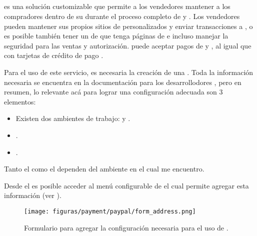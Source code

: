		\subsection*{\PPPaymentProNAME}
			\PPPaymentProNAME es una solución customizable que permite a los vendedores mantener a los compradores dentro de su \websiteINT durante el proceso completo de \paymentsCOM y \checkoutCOM. Los vendedores pueden mantener sus propios sitios de \checkoutCOM personalizados y enviar transacciones a \paypalNAME, o es posible también tener un \hostCPT de \paypalNAME que tenga páginas de \checkoutCOM e incluso manejar la seguridad para las ventas y autorización. \PPPaymentProNAME puede aceptar pagos de \paypalNAME y  \paypalCreditNAME, al igual que con tarjetas de crédito de pago \cite{online_paypal_developer_acceptpayments}.

			Para el uso de este servicio, es necesaria la creación de una \paypalNAME \appINT. Toda la información necesaria se encuentra en la documentación para los desarrollodores \cite{online_paypal_developer_apps_credentials}, pero en resumen, lo relevante acá para lograr una configuración adecuada son 3 elementos:

				\begin{itemize}
					\item Existen dos ambientes de trabajo: \sandboxEnvPL y \liveEnvPL.
					\item \clientIDPayPal.
					\item \secretPayPal.
				\end{itemize}

			Tanto el \clientIDPayPal como el \secretPayPal dependen del ambiente en el cual me encuentro.

			Desde el \dashboardEF es posible acceder al menú configurable de \paypalNAME el cual permite agregar esta información (ver ).

			\begin{figure}[H]
				\centering
				\texttt{[image: figuras/payment/paypal/form\_address.png]}
				\caption{Formulario para agregar la configuración necesaria para el uso de \paypalNAME \paypalPayFlowNAME.}
				\label{figure:payment:paypal:payflow_pro:form}
			\end{figure}

